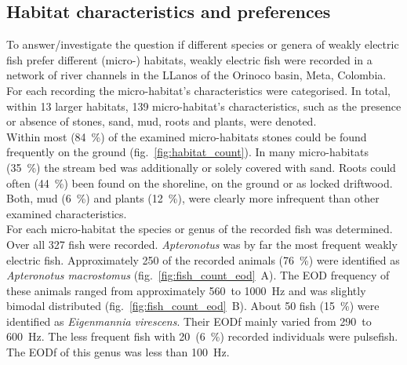 
\subsection{Habitat characteristics and preferences}

To answer/investigate the question if different species or genera of weakly electric fish prefer different (micro-) habitats, weakly electric fish were recorded in a network of river channels in the LLanos of the Orinoco basin, Meta, Colombia. For each recording the micro-habitat's characteristics were categorised. In total, within 13 larger habitats, 139 micro-habitat's characteristics, such as the presence or absence of stones, sand, mud, roots and plants, were denoted.\\
Within most (84~\%) of the examined micro-habitats  stones could be found frequently on the ground (fig.~\ref{fig:habitat_count}). In many micro-habitats  (35~\%) the stream bed was additionally or solely covered with sand. Roots could often (44~\%) been found on the shoreline, on the ground or as locked driftwood. Both, mud (6~\%) and plants (12~\%), were clearly more infrequent than other examined characteristics.\\
For each micro-habitat the species or genus of the recorded fish was determined. Over all 327 fish were recorded. \textit{Apteronotus} was by far the most frequent weakly electric fish. Approximately 250 of the recorded animals (76~\%) were identified as \textit{Apteronotus macrostomus}  (fig.~\ref{fig:fish_count_eod}~A). The EOD frequency of these animals ranged from approximately 560~to 1000~Hz and was slightly bimodal distributed (fig.~\ref{fig:fish_count_eod}~B). About 50 fish (15~\%) were identified as \textit{Eigenmannia virescens}. Their EODf mainly varied from 290~to 600~Hz. The less frequent fish with 20~(6~\%) recorded individuals were pulsefish. The EODf of this genus was less than 100~Hz.

